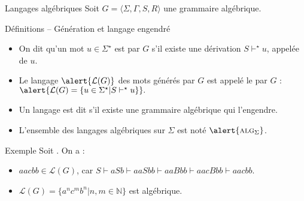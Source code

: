 
\begingroup

\begin{frame}{Langages algébriques}
  Soit \alert{$G = \langle \Sigma, \Gamma, S, R \rangle$} une grammaire algébrique. 

  \begin{block}{Définitions -- Génération et langage engendré}
    \begin{itemize}
    \item On dit qu'un mot $u \in \Sigma^\star$ est  par $G$ s'il existe une dérivation $S \vdash^\star u$, appelée  de $u$. 
    \item Le langage $\alert{\mathcal{L}(G)}$ des mots générés par $G$ est appelé le  par $G$ :
      $\alert{\mathcal{L}(G) = \{u\in\Sigma^\star | S \vdash^\star u \}}.$
    \item Un langage est dit  s'il existe une grammaire algébrique qui l'engendre.
    \item L'ensemble des langages algébriques sur $\Sigma$ est noté $\alert{\textsc{alg}_\Sigma}$.
    \end{itemize}
  \end{block}
  \begin{exampleblock}{Exemple}
    Soit . On a :
    \begin{itemize}
    \item $aacbb \in \mathcal{L}(G)$, car $S \vdash aSb \vdash aaSbb \vdash aaBbb \vdash aacBbb \vdash aacbb$.
    \item $\mathcal{L}(G) = \{a^n c^m b^n | n, m \in \mathbb{N}\}$ est algébrique. 
    \end{itemize}
  \end{exampleblock}
\end{frame}

\endgroup

